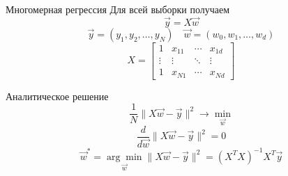 \documentclass[aspectratio=169]{beamer}
\begin{document}
\begin{frame}{Многомерная регрессия}
    Для всей выборки получаем
    {\Large
        \[ \vec{y} = X \vec{w} \]
        \[ \vec{y} = (y_1, y_2, \dots, y_N) \quad \vec{w} = (w_0, w_1, \dots, w_d) \]
        \[
            X = \begin{bmatrix}
                1 & x_{11} & \cdots & x_{1d} \\
                \vdots & \vdots & \ddots & \vdots \\
                1 & x_{N1} & \cdots & x_{Nd}
            \end{bmatrix}
        \]
    }
\end{frame}

\begin{frame}{Аналитическое решение}
    \LARGE
    \[ \frac{1}{N} \| X \vec{w} - \vec{y} \|^2 \rightarrow \min_{\vec{w}} \]
    \pause{}
    \[ \frac{d}{d \vec{w}} \| X \vec{w} - \vec{y} \|^2 = 0 \]
    \pause{}
    \[
        \vec{w}^* = \underset{\vec{w}}{\arg\min} \| X \vec{w} - \vec{y} \|^2
        = {(X^T X)}^{-1} X^T \vec{y}
    \]
\end{frame}
\end{document}
